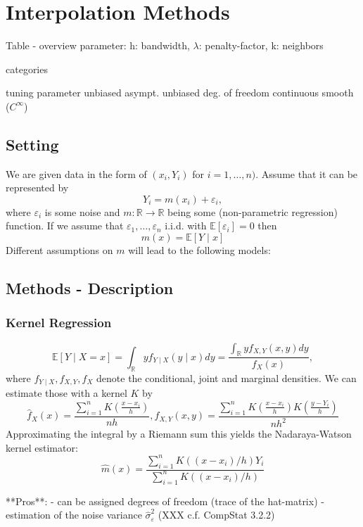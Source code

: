 \chapter{Interpolation Methods}
Table - overview
parameter: {h: bandwidth, $\lambda$: penalty-factor, k: neighbors}



categories

tuning parameter
unbiased
asympt. unbiased
deg. of freedom
continuous
smooth ($C^\infty$)


\section{Setting}

We are given data in the form of $\left(x_{i}, Y_{i}\right)$ for $i=1, \ldots, n)$. Assume that it can be represented by
$$
    Y_{i}=m\left(x_{i}\right)+\varepsilon_{i},
$$
where $\varepsilon_i$ is some noise and $m: \mathbb{R} \rightarrow \mathbb{R}$ being some (non-parametric regression) function. If we assume that $\varepsilon_{1}, \ldots, \varepsilon_{n}$ i.i.d. with $\mathbb{E}\left[\varepsilon_{i}\right]=0$ then $$m(x)=\mathbb{E}[Y \mid x]$$
Different assumptions on $m$ will lead to the following models:




\section{Methods - Description}

\subsection{Kernel Regression}
\label{sec:Kernel}
$$
    \mathbb{E}[Y \mid X=x]
    = \int_{\mathbb{R}} y f_{Y \mid X}(y \mid x) d y
    =\frac{\int_{\mathbb{R}} y f_{X, Y}(x, y) d y}{f_{X}(x)},
$$
where $f_{Y \mid X}, f_{X, Y}, f_{X}$ denote the conditional, joint and marginal densities.
We can estimate those with a kernel $K$ by
$$
    \hat{f}_{X}(x)=\frac{\sum_{i=1}^{n} K\left(\frac{x-x_{i}}{h}\right)}{n h}, \hat{f}_{X, Y}(x, y)=\frac{\sum_{i=1}^{n} K\left(\frac{x-x_{i}}{h}\right) K\left(\frac{y-Y_{i}}{h}\right)}{n h^{2}}
$$
Approximating the integral by a Riemann sum this yields the Nadaraya-Watson kernel estimator:
$$\hat{m}(x)=\frac{\sum_{i=1}^{n} K\left(\left(x-x_{i}\right) / h\right) Y_{i}}{\sum_{i=1}^{n} K\left(\left(x-x_{i}\right) / h\right)}$$

**Pros**:
- can be assigned degrees of freedom (trace of the hat-matrix)
- estimation of the noise variance $\hat \sigma_\varepsilon^2$ (XXX c.f. CompStat 3.2.2)

